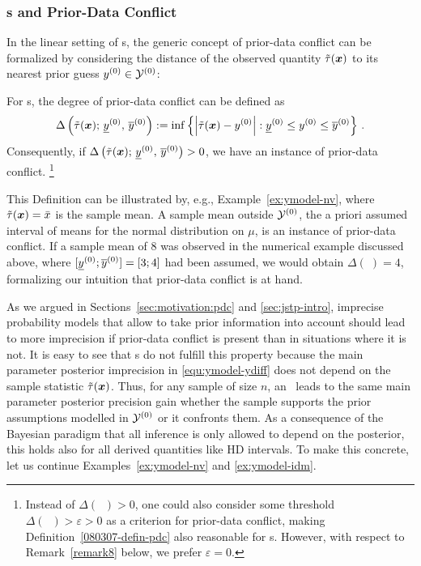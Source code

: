 \subsubsection{\ymodel s and Prior-Data Conflict}
\label{section:fixednschlecht}
In the linear setting of \ymodel s, the generic concept of prior-data conflict
can be formalized by considering the distance of the observed quantity $\tilde{\tau}({\bm x})$ to
its nearest prior guess $y^{(0)} \in \mathcal{Y}^{(0)}$:
%
\begin{definition}\label{080307-defin-pdc}
For \ymodel s, the degree of prior-data conflict can be defined %
as
\begin{equation}\label{se-071217}
\Delta \left(\tilde{\tau}({\bm x});\, \underline{y}^{(0)},\,\overline{y}^{(0)}\right)
:= \inf \left\{ \left| \tilde{\tau}({\bm x}) - y^{(0)} \right|: \underline{y}^{(0)} \le y^{(0)} \le \overline{y}^{(0)} \right\}\,.
\end{equation}
Consequently, if
$\Delta \left(\tilde{\tau}({\bm x});\, \underline{y}^{(0)},\,\overline{y}^{(0)}\right) > 0$,
we have an instance of prior-data conflict.%
\footnote{Instead of $\Delta(\;\;) > 0$, one could also consider some
threshold $\Delta(\;\;) > \varepsilon > 0$ as a criterion for prior-data conflict, making
Definition~\ref{080307-defin-pdc} also reasonable for \model s.
However, with respect to Remark~\ref{remark8} below, we prefer $\varepsilon = 0$.}
\end{definition}
This Definition can be illustrated by, e.g., Example~\ref{ex:ymodel-nv}, where $\tilde{\tau}({\bm x}) = \bar{x}$
is the sample mean. A sample mean outside $\mathcal{Y}^{(0)}$, the a priori assumed interval
of means for the normal distribution on $\mu$, is an instance of prior-data conflict.
If a sample mean of $8$ was observed in the numerical example discussed above, where
$[\underline{y}^{(0)} ; \overline{y}^{(0)}] =[3;4]$ had been assumed, we would obtain $\Delta(\;) = 4$,
formalizing our intuition that prior-data conflict is at hand.

As we argued in Sections~\ref{sec:motivation:pdc} and \ref{sec:jstp-intro},
imprecise probability models that allow to take prior information into account
should lead to more imprecision if prior-data
conflict is present than in situations where it is not.
%
It is easy to see that \ymodel s do not fulfill this property
because the main parameter posterior imprecision in
\eqref{equ:ymodel-ydiff} does not depend on the sample statistic
$\tilde{\tau}({\bm x})$. Thus, for any sample of size $n$, an \ymodel\ leads
to the same main parameter posterior precision gain
whether the sample supports the prior assumptions modelled in
$\mathcal{Y}^{(0)}$ or it confronts them. As a consequence of the
Bayesian paradigm that all inference is only allowed to depend on
the posterior, this holds also for all derived quantities
like HD intervals. To make this concrete,
let us continue Examples~\ref{ex:ymodel-nv} and \ref{ex:ymodel-idm}.

